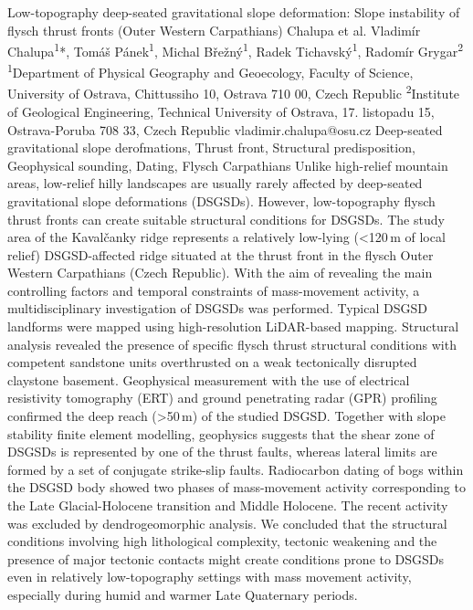 
\abstract
{Low-topography deep-seated gravitational slope deformation: Slope instability of flysch thrust fronts (Outer Western Carpathians)} 
{Chalupa et al.} 
{Vladimír Chalupa\textsuperscript{1}*, Tomáš Pánek\textsuperscript{1}, Michal Břežný\textsuperscript{1}, Radek Tichavský\textsuperscript{1}, Radomír Grygar\textsuperscript{2}} 
{\TLtag} 
{
\textsuperscript{1}Department of Physical Geography and Geoecology, Faculty of Science, University of Ostrava, Chittussiho 10, Ostrava 710 00, Czech Republic
\textsuperscript{2}Institute of Geological Engineering, Technical University of Ostrava, 17. listopadu 15, Ostrava-Poruba 708 33, Czech Republic
}
{vladimir.chalupa@osu.cz}  %
{Deep-seated gravitational slope derofmations, Thrust front, Structural predisposition, Geophysical sounding, Dating, Flysch Carpathians}
{Unlike high-relief mountain areas, low-relief hilly landscapes are usually rarely affected by deep-seated gravitational slope deformations (DSGSDs). However, low-topography flysch thrust fronts can create suitable structural conditions for DSGSDs. The study area of the Kavalčanky ridge represents a relatively low-lying (<120 m of local relief) DSGSD-affected ridge situated at the thrust front in the flysch Outer Western Carpathians (Czech Republic). With the aim of revealing the main controlling factors and temporal constraints of mass-movement activity, a multidisciplinary investigation of DSGSDs was performed. Typical DSGSD landforms were mapped using high-resolution LiDAR-based mapping. Structural analysis revealed the presence of specific flysch thrust structural conditions with competent sandstone units overthrusted on a weak tectonically disrupted claystone basement. Geophysical measurement with the use of electrical resistivity tomography (ERT) and ground penetrating radar (GPR) profiling confirmed the deep reach (>50 m) of the studied DSGSD. Together with slope stability finite element modelling, geophysics suggests that the shear zone of DSGSDs is represented by one of the thrust faults, whereas lateral limits are formed by a set of conjugate strike-slip faults. Radiocarbon dating of bogs within the DSGSD body showed two phases of mass-movement activity corresponding to the Late Glacial-Holocene transition and Middle Holocene. The recent activity was excluded by dendrogeomorphic analysis. We concluded that the structural conditions involving high lithological complexity, tectonic weakening and the presence of major tectonic contacts might create conditions prone to DSGSDs even in relatively low-topography settings with mass movement activity, especially during humid and warmer Late Quaternary periods.
}
